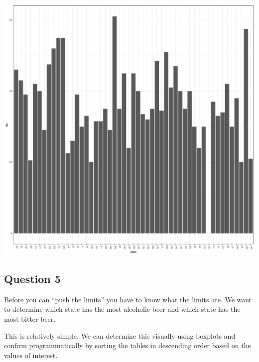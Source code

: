 \documentclass[]{article}
\newenvironment{Shaded}{\begin{snugshade}}{\end{snugshade}}
\newcommand{\KeywordTok}[1]{\textcolor[rgb]{0.13,0.29,0.53}{\textbf{#1}}}
\newcommand{\DataTypeTok}[1]{\textcolor[rgb]{0.13,0.29,0.53}{#1}}
\newcommand{\DecValTok}[1]{\textcolor[rgb]{0.00,0.00,0.81}{#1}}
\newcommand{\StringTok}[1]{\textcolor[rgb]{0.31,0.60,0.02}{#1}}
\newcommand{\CommentTok}[1]{\textcolor[rgb]{0.56,0.35,0.01}{\textit{#1}}}
\newcommand{\OperatorTok}[1]{\textcolor[rgb]{0.81,0.36,0.00}{\textbf{#1}}}
\newcommand{\NormalTok}[1]{#1}
\begin{document}
\begin{center}\includegraphics{Analysis_Final_files/figure-latex/unnamed-chunk-17-2} \end{center}

\subsection{Question 5}\label{question-5}

Before you can ``push the limits'' you have to know what the limits are.
We want to determine which state has the most alcoholic beer and which
state has the most bitter beer.

This is relatively simple. We can determine this visually using boxplots
and confirm programmatically by sorting the tables in descending order
based on the values of interest.

\begin{Shaded}
\end{Shaded}
\end{document}
